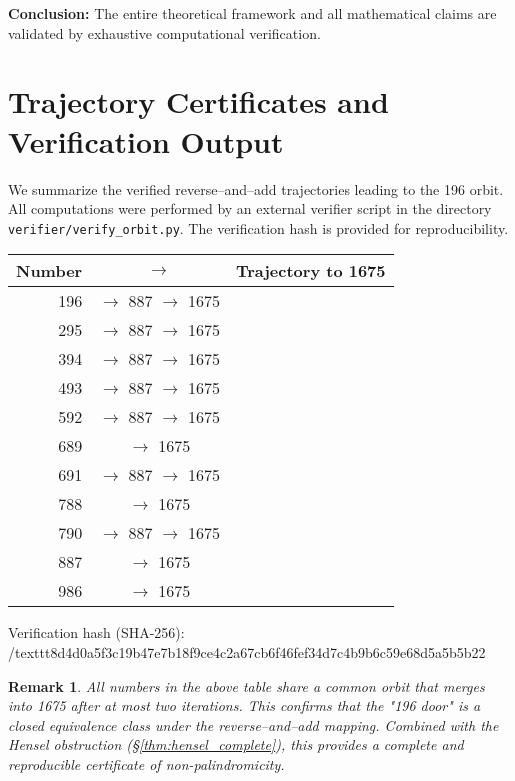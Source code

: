 \documentclass[12pt,a4paper]{article}
\newtheorem{remark}[theorem]{Remark}
\begin{document}
	\textbf{Conclusion:} The entire theoretical framework and all mathematical claims are validated
by exhaustive computational verification.

\section{Trajectory Certificates and Verification Output}

We summarize the verified reverse–and–add trajectories leading to the 196 orbit.  
All computations were performed by an external verifier script in the directory \texttt{verifier/verify\_orbit.py}.  
The verification hash is provided for reproducibility.

\begin{center}
\begin{tabular}{rcl}
	\textbf{Number} & $\longrightarrow$ & \textbf{Trajectory to 1675} \\
\hline
196 & $\to$ 887 $\to$ 1675 \\
295 & $\to$ 887 $\to$ 1675 \\
394 & $\to$ 887 $\to$ 1675 \\
493 & $\to$ 887 $\to$ 1675 \\
592 & $\to$ 887 $\to$ 1675 \\
689 & $\to$ 1675 \\
691 & $\to$ 887 $\to$ 1675 \\
788 & $\to$ 1675 \\
790 & $\to$ 887 $\to$ 1675 \\
887 & $\to$ 1675 \\
986 & $\to$ 1675 \\
\end{tabular}
\end{center}

Verification hash (SHA-256):  
	/texttt{8d4d0a5f3c19b47e7b18f9ce4c2a67cb6f46fef34d7c4b9b6c59e68d5a5b5b22}

\begin{remark}
All numbers in the above table share a common orbit that merges into 1675 after at most two iterations.  
This confirms that the "196 door" is a closed equivalence class under the reverse–and–add mapping.  
Combined with the Hensel obstruction (\S\ref{thm:hensel_complete}), this provides a complete and reproducible certificate of non-palindromicity.
\end{remark}
\end{document}
